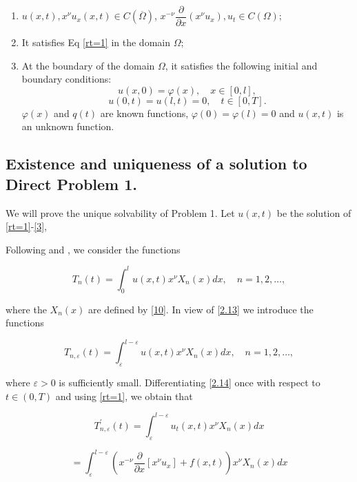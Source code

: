 \documentclass[reqno]{amsart}
\theoremstyle{definition}
\numberwithin{equation}{section}
\begin{document}
\begin{enumerate}
    \item $u(x,t), x^{\nu}u_x(x,t)\in C(\overline{\Omega})$, $x^{-\nu}\dfrac{\partial}{\partial x}\left(x^{\nu}u_x\right), u_t \in C(\Omega);$
    \item It satisfies Eq \eqref{rt=1} in the domain $\Omega$;
    \item At the boundary of the domain $\Omega$, it satisfies the following initial and boundary conditions:
\begin{equation}\label{2}
    u(x, 0)=\varphi(x), \quad x \in [0,l],
\end{equation}
\begin{equation}\label{3}
    u(0, t)=u(l, t)=0, \quad t \in[0, T] .
\end{equation}
$\varphi(x)$ and $q(t)$ are known functions, $\varphi(0)=\varphi(l)=0$  and $u(x,t)$ is an unknown function.
\end{enumerate}


\subsection{Existence and uniqueness of a solution to Direct Problem 1.}
We will prove the  unique solvability of Problem 1.
Let $u(x, t)$ be the solution of \eqref{rt=1}-\eqref{3}, 


Following \cite{Sabitov} and \cite{Vagapova}, we consider the functions

\begin{equation}\label{2.13}
    T_n(t)=\int_0^l u(x, t) x^\nu X_n(x) d x, \quad n=1,2, \ldots,
\end{equation}

where the $X_n(x)$ are defined by \eqref{10}. In view of \eqref{2.13} we introduce the functions

\begin{equation}\label{2.14}
    T_{n, \varepsilon}(t)=\int_{\varepsilon}^{l-\varepsilon} u(x, t) x^\nu X_n(x) d x, \quad n=1,2, \ldots,
\end{equation}


where $\varepsilon>0$ is sufficiently small. Differentiating \eqref{2.14} once with respect to $t \in (0,T)$ and using \eqref{rt=1}, we obtain that

$$T_{n, \varepsilon}^{\prime}(t)  =\int_{\varepsilon}^{l-\varepsilon} u_{t}(x, t) x^\nu X_n(x) d x$$

$$=\int_{\varepsilon}^{l-\varepsilon}\left(x^{-\nu} \frac{\partial}{\partial x}\left[x^\nu u_x\right]+f(x,t)\right) x^\nu X_n(x) d x $$
\end{document}
